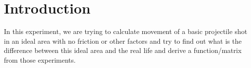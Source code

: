 \chapter{Introduction}
In this experiment, we are trying to calculate movement of a basic projectile shot in an ideal area with no friction or other factors and try to find out what is the difference between this ideal area and the real life and derive a function/matrix from those experiments. 
